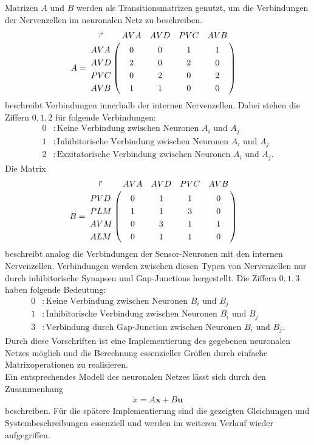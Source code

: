 	Matrizen $A$ und $B$ werden als Transitionsmatrizen genutzt, um die Verbindungen der Nervenzellen im neuronalen Netz zu beschreiben.
	\begin{align}
		\label{eq:mat_A}
		A &= \bordermatrix{
		\quad\Rsh& AVA & AVD & PVC & AVB \cr
			AVA &  0  &  0  &  1  &  1  \cr
			AVD &  2  &  0  &  2  &  0  \cr
			PVC &  0  &  2  &  0  &  2  \cr
			AVB &  1  &  1  &  0  &  0  \cr
		}
	\end{align}
	beschreibt Verbindungen innerhalb der internen Nervenzellen. Dabei stehen die Ziffern ${0,1,2}$ für folgende Verbindungen:
	\begin{align*}
		0 &: \text{Keine Verbindung zwischen Neuronen }A_i\text{ und } A_j\\
		1 &: \text{Inhibitorische Verbindung zwischen Neuronen }A_i\text{ und }A_j\\
		2 &: \text{Exzitatorische Verbindung zwischen Neuronen }A_i\text{ und }A_j.
	\end{align*}
	Die Matrix
	\begin{align}
		\label{eq:mat_B}
		B &= \bordermatrix{
		\quad\Rsh& AVA & AVD & PVC & AVB \cr
			PVD &  0  &  1  &  1  &  0  \cr
			PLM &  1  &  1  &  3  &  0  \cr
			AVM &  0  &  3  &  1  &  1  \cr
			ALM &  0  &  1  &  1  &  0  \cr
		}
	\end{align}
	beschreibt analog die Verbindungen der Sensor-Neuronen mit den internen Nervenzellen. Verbindungen werden zwischen diesen Typen von Nervenzellen nur durch inhibitorische Synapsen und Gap-Junctions hergestellt. Die Ziffern ${0,1,3}$ haben folgende Bedeutung:
	\begin{align*}
		0 &: \text{Keine Verbindung zwischen Neuronen }B_i\text{ und } B_j\\
		1 &: \text{Inhibitorische Verbindung zwischen Neuronen }B_i\text{ und }B_j\\
		3 &: \text{Verbindung durch Gap-Junction zwischen Neuronen }B_i\text{ und }B_j.
	\end{align*}
	Durch diese Vorschriften ist eine Implementierung des gegebenen neuronalen Netzes möglich und die Berechnung essenzieller Größen durch einfache Matrixoperationen zu realisieren.\\
	Ein entsprechendes Modell des neuronalen Netzes lässt sich durch den Zusammenhang
	\begin{align}
		\dot{x} = A\boldsymbol{x} + B\boldsymbol{u}
	\end{align}
	beschreiben. Für die spätere Implementierung sind die gezeigten Gleichungen und Systembeschreibungen essenziell und werden im weiteren Verlauf wieder aufgegriffen.

